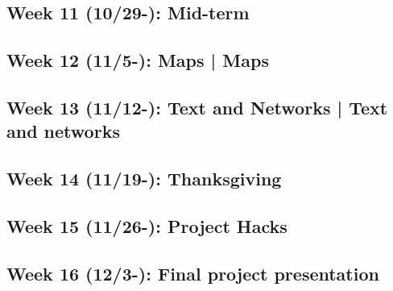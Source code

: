 \documentclass[11pt,article,oneside]{memoir} %
\begin{document}
\subsection{Week 11 (10/29-): Mid-term}
\subsection{Week 12 (11/5-): Maps | Maps }
\subsection{Week 13 (11/12-): Text and Networks | Text and networks} 
\subsection{Week 14 (11/19-): Thanksgiving }
\subsection{Week 15 (11/26-): Project Hacks }
\subsection{Week 16 (12/3-): Final project presentation}
\end{document}
